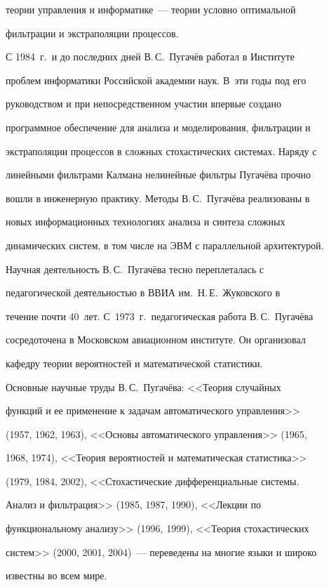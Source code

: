 теории управления и информатике~--- теории условно оптимальной 


фильтрации и экстраполяции процессов.


    


    С 1984~г.\ и до последних дней В.\,С.~Пугачёв работал в Институте 


проблем информатики Российской академии наук. В~эти годы под его 


руководством и при непосредственном участии впервые создано 


программное обеспечение для анализа и моделирования, фильтрации и 


экстраполяции процессов в сложных стохастических системах. Наряду с 


линейными фильтрами Калмана нелинейные фильтры Пугачёва прочно 


вошли в инженерную практику. Методы В.\,С.~Пугачёва реализованы в 


новых информационных технологиях анализа и синтеза сложных 


динамических систем, в том числе на ЭВМ с параллельной архитектурой. 


    


    Научная деятельность В.\,С.~Пугачёва тесно переплеталась с 


педагогической деятельностью в ВВИА им.\ Н.\,Е.~Жуковского в 


течение почти 40~лет. С~1973~г.\ педагогическая работа В.\,С.~Пугачёва 


сосредоточена в Московском авиационном институте. Он организовал 


кафедру теории вероятностей и математической статистики.


    


    Основные научные труды В.\,С.~Пугачёва: <<Теория случайных 


функций и ее применение к задачам автоматического управления>> 


(1957, 1962, 1963), <<Основы автоматического управления>> (1965, 


1968, 1974), <<Теория вероятностей и математическая статистика>> 


(1979, 1984, 2002), <<Стохастические дифференциальные системы. 


Анализ и фильтрация>> (1985, 1987, 1990), <<Лекции по 


функциональному анализу>> (1996, 1999), <<Теория стохастических 


систем>> (2000, 2001, 2004)~--- переведены на многие языки и широко 


известны во всем мире.


     


